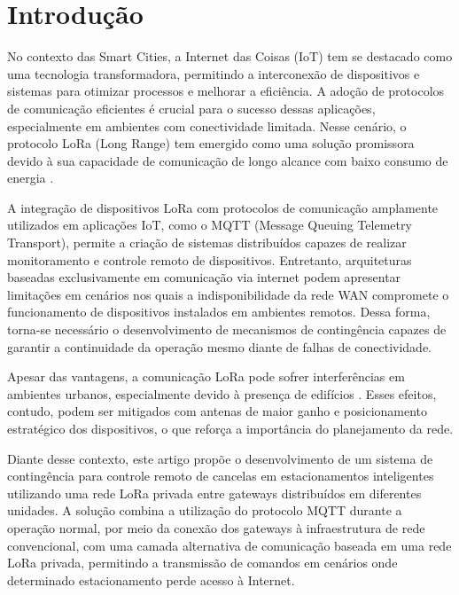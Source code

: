\documentclass[
article,            %
11pt,               %
twoside,            %
a4paper,            %
section=TITLE,      %
onecolumn,          %
english,            %
brazil,             %
sumario=tradicional
]{abntex2}
\begin{document}
\textual

\section{Introdução}

No contexto das Smart Cities, a Internet das Coisas (IoT) tem se destacado como uma tecnologia transformadora, permitindo a interconexão de dispositivos e sistemas para otimizar processos e melhorar a eficiência. A adoção de protocolos de comunicação eficientes é crucial para o sucesso dessas aplicações, especialmente em ambientes com conectividade limitada. Nesse cenário, o protocolo LoRa (Long Range) tem emergido como uma solução promissora devido à sua capacidade de comunicação de longo alcance com baixo consumo de energia \cite{Yoon2020}.

A integração de dispositivos LoRa com protocolos de comunicação amplamente utilizados em aplicações IoT, como o MQTT (Message Queuing Telemetry Transport), permite a criação de sistemas distribuídos capazes de realizar monitoramento e controle remoto de dispositivos. Entretanto, arquiteturas baseadas exclusivamente em comunicação via internet podem apresentar limitações em cenários nos quais a indisponibilidade da rede WAN compromete o funcionamento de dispositivos instalados em ambientes remotos. Dessa forma, torna-se necessário o desenvolvimento de mecanismos de contingência capazes de garantir a continuidade da operação mesmo diante de falhas de conectividade.

Apesar das vantagens, a comunicação LoRa pode sofrer interferências em ambientes urbanos, especialmente devido à presença de edifícios \cite{lima2023}. Esses efeitos, contudo, podem ser mitigados com antenas de maior ganho e posicionamento estratégico dos dispositivos, o que reforça a importância do planejamento da rede.

Diante desse contexto, este artigo propõe o desenvolvimento de um sistema de contingência para controle remoto de cancelas em estacionamentos inteligentes utilizando uma rede LoRa privada entre gateways distribuídos em diferentes unidades. A solução combina a utilização do protocolo MQTT durante a operação normal, por meio da conexão dos gateways à infraestrutura de rede convencional, com uma camada alternativa de comunicação baseada em uma rede LoRa privada, permitindo a transmissão de comandos em cenários onde determinado estacionamento perde acesso à Internet.
\end{document}
